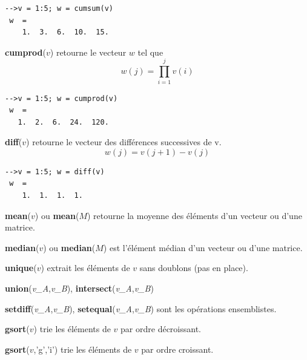 \documentclass{article}
\begin{document}
\begin{multicols}{3}
\begin{description}
\begin{verbatim}
-->v = 1:5; w = cumsum(v)
 w  =
    1.  3.  6.  10.  15.  
\end{verbatim}
\item{\textbf{cumprod}($v$)} retourne le vecteur $w$ tel que $$w(j) = \prod_{i=1}^{j} v(i)$$
\begin{verbatim}
-->v = 1:5; w = cumprod(v)
 w  =
   1.  2.  6.  24.  120.   
\end{verbatim}
\item{\textbf{diff}($v$)} retourne le vecteur des différences successives de v.
$$w(j) = v(j+1)-v(j)$$
\begin{verbatim}
-->v = 1:5; w = diff(v)
 w  =
    1.  1.  1.  1.  
\end{verbatim}
\item{\textbf{mean}($v$) ou \textbf{mean}($M$)}  retourne la moyenne des éléments d'un vecteur ou d'une matrice.
\item{\textbf{median}($v$) ou \textbf{median}($M$)}  est l'élément médian d'un vecteur ou d'une matrice.
\item{\textbf{unique}($v$)} extrait les éléments de $v$ sans doublons (pas en place).
\item{\textbf{union}(\textit{v\_A},\textit{v\_B}), \textbf{intersect}(\textit{v\_A},\textit{v\_B})}
\item{\textbf{setdiff}(\textit{v\_A},\textit{v\_B}), \textbf{setequal}(\textit{v\_A},\textit{v\_B})} sont les opérations ensemblistes.
\item{\textbf{gsort}($v$)} trie les éléments de $v$ par ordre décroissant.
\item{\textbf{gsort}($v$,'g','i')}  trie les éléments de $v$ par ordre croissant.
\end{description}

\end{multicols}
\end{document}
